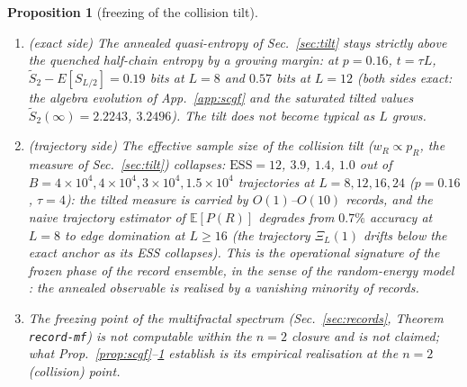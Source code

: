 \documentclass[11pt]{article}
\newtheorem{proposition}{Proposition}
\newcommand{\E}{\mathbb{E}}
\begin{document}
\begin{proposition}[freezing of the collision tilt]\label{prop:freeze}
\begin{enumerate}
\item[(i)] \emph{(exact side)} The annealed quasi-entropy of
      Sec.~\ref{sec:tilt} stays strictly above the quenched half-chain
      entropy by a growing margin: at $p=0.16$, $t=\tau L$,
      $\tilde S_2-E[S_{L/2}]=0.19$ bits at $L=8$ and $0.57$ bits at $L=12$
      (both sides exact: the algebra evolution of App.~\ref{app:scgf} and
      the saturated tilted values $\tilde S_2(\infty)=2.2243$, $3.2496$).
      The tilt does not become typical as $L$ grows.
\item[(ii)] \emph{(trajectory side)} The effective sample size of the
      collision tilt ($w_R\propto p_R$, the measure of
      Sec.~\ref{sec:tilt}) collapses: $\mathrm{ESS}=12$, $3.9$, $1.4$,
      $1.0$ out of $B=4\times10^4,4\times10^4,3\times10^4,1.5\times10^4$
      trajectories at $L=8,12,16,24$ ($p=0.16$, $\tau=4$): the tilted
      measure is carried by $O(1)$--$O(10)$ records, and the naive
      trajectory estimator of $\E[P(R)]$ degrades from $0.7\%$ accuracy at
      $L=8$ to edge domination at $L\ge16$ (the trajectory $\Xi_L(1)$
      drifts below the exact anchor as its ESS collapses).  This is the
      operational signature of the frozen phase of the record ensemble, in
      the sense of the random-energy model \citep{Derrida1981}: the
      annealed observable is realised by a vanishing minority of records.
\item[(iii)] The freezing point of the multifractal spectrum
      (Sec.~\ref{sec:records}, Theorem \texttt{record-mf}) is not
      computable within the $n=2$ closure and is not claimed; what
      Prop.~\ref{prop:scgf}--\ref{prop:freeze} establish is its empirical
      realisation at the $n=2$ (collision) point.
\end{enumerate}
\end{proposition}
\end{document}

